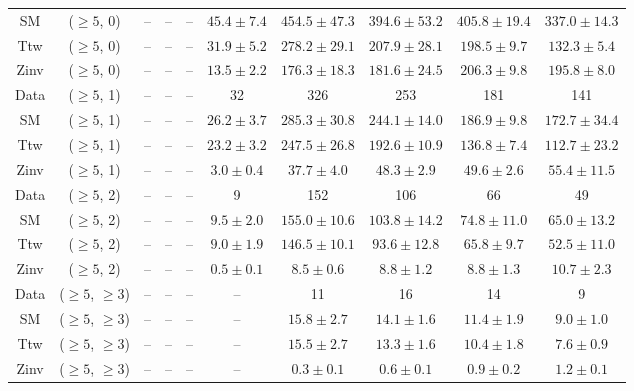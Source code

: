 \begin{table}[h!]
{\begin{tabular}{cccccccccc}
	SM & ($\ge5$, 0) & -- & -- & -- & $45.4\pm 7.4$ & $454.5\pm 47.3$ & $394.6\pm 53.2$ & $405.8\pm 19.4$ & $337.0\pm 14.3$ \\[0.5ex] 
	Ttw & ($\ge5$, 0) & -- & -- & -- & $31.9\pm 5.2$ & $278.2\pm 29.1$ & $207.9\pm 28.1$ & $198.5\pm 9.7$ & $132.3\pm 5.4$ \\[0.5ex] 
	Zinv & ($\ge5$, 0) & -- & -- & -- & $13.5\pm 2.2$ & $176.3\pm 18.3$ & $181.6\pm 24.5$ & $206.3\pm 9.8$ & $195.8\pm 8.0$ \\[0.5ex] 
	Data & ($\ge5$, 1) & -- & -- & -- & 32 & 326 & 253 & 181 & 141 \\[0.5ex] 
	SM & ($\ge5$, 1) & -- & -- & -- & $26.2\pm 3.7$ & $285.3\pm 30.8$ & $244.1\pm 14.0$ & $186.9\pm 9.8$ & $172.7\pm 34.4$ \\[0.5ex] 
	Ttw & ($\ge5$, 1) & -- & -- & -- & $23.2\pm 3.2$ & $247.5\pm 26.8$ & $192.6\pm 10.9$ & $136.8\pm 7.4$ & $112.7\pm 23.2$ \\[0.5ex] 
	Zinv & ($\ge5$, 1) & -- & -- & -- & $3.0\pm 0.4$ & $37.7\pm 4.0$ & $48.3\pm 2.9$ & $49.6\pm 2.6$ & $55.4\pm 11.5$ \\[0.5ex] 
	Data & ($\ge5$, 2) & -- & -- & -- & 9 & 152 & 106 & 66 & 49 \\[0.5ex] 
	SM & ($\ge5$, 2) & -- & -- & -- & $9.5\pm 2.0$ & $155.0\pm 10.6$ & $103.8\pm 14.2$ & $74.8\pm 11.0$ & $65.0\pm 13.2$ \\[0.5ex] 
	Ttw & ($\ge5$, 2) & -- & -- & -- & $9.0\pm 1.9$ & $146.5\pm 10.1$ & $93.6\pm 12.8$ & $65.8\pm 9.7$ & $52.5\pm 11.0$ \\[0.5ex] 
	Zinv & ($\ge5$, 2) & -- & -- & -- & $0.5\pm 0.1$ & $8.5\pm 0.6$ & $8.8\pm 1.2$ & $8.8\pm 1.3$ & $10.7\pm 2.3$ \\[0.5ex] 
	Data & ($\ge5$, $\ge3$) & -- & -- & -- & -- & 11 & 16 & 14 & 9 \\[0.5ex] 
	SM & ($\ge5$, $\ge3$) & -- & -- & -- & -- & $15.8\pm 2.7$ & $14.1\pm 1.6$ & $11.4\pm 1.9$ & $9.0\pm 1.0$ \\[0.5ex] 
	Ttw & ($\ge5$, $\ge3$) & -- & -- & -- & -- & $15.5\pm 2.7$ & $13.3\pm 1.6$ & $10.4\pm 1.8$ & $7.6\pm 0.9$ \\[0.5ex] 
	Zinv & ($\ge5$, $\ge3$) & -- & -- & -- & -- & $0.3\pm 0.1$ & $0.6\pm 0.1$ & $0.9\pm 0.2$ & $1.2\pm 0.1$ \\[0.5ex] 
	\hline
	\hline
\end{tabular}}
\end{table}
